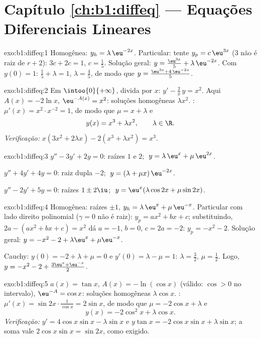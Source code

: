 \section*{Capítulo \ref{ch:b1:diffeq} --- Equações Diferenciais Lineares}

\begin{solution}{exo:b1:diffeq:1}
Homogênea: $y_h = \lambda\,\eu^{-2x}$. Particular: tente $y_p =
c\,\eu^{3x}$ ($3$ não é raiz de $r + 2$): $3c + 2c = 1$, $c =
\frac15$. Solução geral: $y = \frac{\eu^{3x}}{5} +
\lambda\,\eu^{-2x}$. Com $y(0) = 1$: $\frac15 + \lambda = 1$,
$\lambda = \frac45$, de modo que $y = \frac{\eu^{3x} + 4\,\eu^{-2x}}{5}$.
\end{solution}

\begin{solution}{exo:b1:diffeq:2}
Em $\intoo{0}{+\infty}$, divida por $x$: $y' - \frac{2}{x}\,y = x^2$.
Aqui $A(x) = -2\ln x$, $\eu^{-A(x)} = x^2$: soluções homogêneas
$\lambda x^2$. : $\mu'(x) = x^2 \cdot x^{-2} =
1$, de modo que $\mu = x + \lambda$ e
\[
y(x) = x^3 + \lambda x^2, \qquad \lambda \in \R .
\]
\emph{Verificação:} $x(3x^2 + 2\lambda x) - 2(x^3 + \lambda x^2) = x^3$.
\end{solution}

\begin{solution}{exo:b1:diffeq:3}
$y'' - 3y' + 2y = 0$: raízes $1$ e $2$; $\;y = \lambda\,\eu^{x} +
\mu\,\eu^{2x}$.

$y'' + 4y' + 4y = 0$: raiz dupla $-2$; $\;y = (\lambda + \mu
x)\,\eu^{-2x}$.

$y'' - 2y' + 5y = 0$: raízes $1 \pm 2\iu$; $\;y = \eu^{x}(\lambda\cos
2x + \mu\sin 2x)$.
\end{solution}

\begin{solution}{exo:b1:diffeq:4}
Homogênea: raízes $\pm 1$, $y_h = \lambda\,\eu^x + \mu\,\eu^{-x}$.
Particular com lado direito polinomial ($\gamma = 0$ não é raiz):
$y_p = ax^2 + bx + c$; substituindo, $2a - (ax^2 + bx + c) = x^2$
dá $a = -1$, $b = 0$, $c = 2a = -2$: $y_p = -x^2 - 2$. Solução
geral: $y = -x^2 - 2 + \lambda\eu^x + \mu\eu^{-x}$.

Cauchy: $y(0) = -2 + \lambda + \mu = 0$ e $y'(0) = \lambda - \mu =
1$: $\lambda = \frac32$, $\mu = \frac12$. Logo,
$y = -x^2 - 2 + \frac{3\eu^x + \eu^{-x}}{2}$.
\end{solution}

\begin{solution}{exo:b1:diffeq:5}
$a(x) = \tan x$, $A(x) = -\ln(\cos x)$ (válido: $\cos > 0$ no
intervalo), $\eu^{-A} = \cos x$: soluções homogêneas $\lambda\cos x$.
: $\mu'(x) = \sin 2x \cdot \frac{1}{\cos x} =
2\sin x$, de modo que $\mu = -2\cos x + \lambda$ e
\[
y(x) = -2\cos^2 x + \lambda \cos x .
\]
\emph{Verificação:} $y' = 4\cos x \sin x - \lambda\sin x$ e $y\tan x =
-2\cos x\sin x + \lambda \sin x$; a soma vale $2\cos x\sin x =
\sin 2x$, como exigido.
\end{solution}

